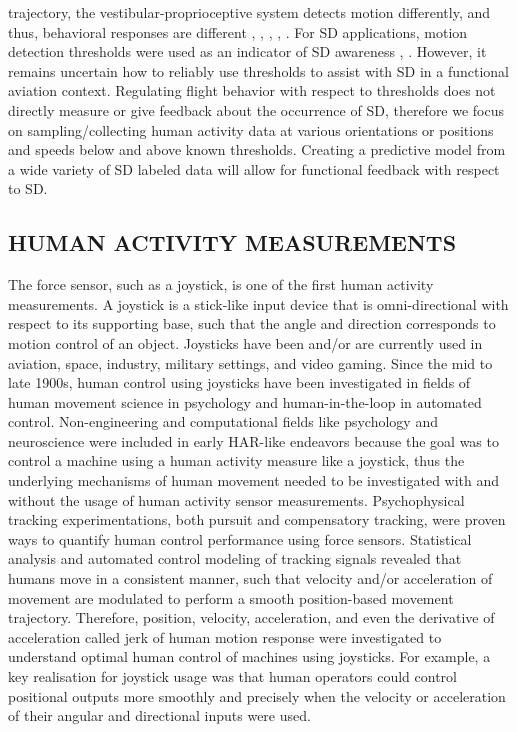 \documentclass{ieeeaccess}
\begin{document}
trajectory, the vestibular-proprioceptive system detects motion differently, and thus, behavioral responses are different \cite{Soyka_2011_Predicting}, \cite{Valko_2012_Vestibular}, \cite{Hartmann_2014_Direction}, \cite{BermudezRey_2016_Vestibular}, \cite{Karmali_2017_Multivariate}. For SD applications, motion detection thresholds were used as an indicator of SD awareness \cite{Gillingham_1993_Spatial}, \cite{Previc_2004_Spatial}. However, it remains uncertain how to reliably use thresholds to assist with SD in a functional aviation context. Regulating flight behavior with respect to thresholds does not directly measure or give feedback about the occurrence of SD, therefore we focus on sampling/collecting human activity data at various orientations or positions and speeds below and above known thresholds. Creating a predictive model from a wide variety of SD labeled data will allow for functional feedback with respect to SD.

\subsection{HUMAN ACTIVITY MEASUREMENTS}
The force sensor, such as a joystick, is one of the first human activity measurements. A joystick is a stick-like input device that is omni-directional with respect to its supporting base, such that the angle and direction corresponds to motion control of an object. Joysticks have been and/or are currently used in aviation, space, industry, military settings, and video gaming. Since the mid to late 1900s, human control using joysticks have been investigated in fields of human movement science in psychology and human-in-the-loop in automated control. Non-engineering and computational fields like psychology and neuroscience were included in early HAR-like endeavors because the goal was to control a machine using a human activity measure like a joystick, thus the underlying mechanisms of human movement needed to be investigated with and without the usage of human activity sensor measurements. Psychophysical tracking experimentations, both pursuit and compensatory tracking, were proven ways to quantify human control performance using force sensors. Statistical analysis and automated control modeling of tracking signals revealed that humans move in a consistent manner, such that velocity and/or acceleration of movement are modulated to perform a smooth position-based movement trajectory. Therefore, position, velocity, acceleration, and even the derivative of acceleration called jerk of human motion response were investigated to understand optimal human control of machines using joysticks. For example, a key realisation for joystick usage was that human operators could control positional outputs more smoothly and precisely when the velocity or acceleration of their angular and directional inputs were used.
\end{document}
